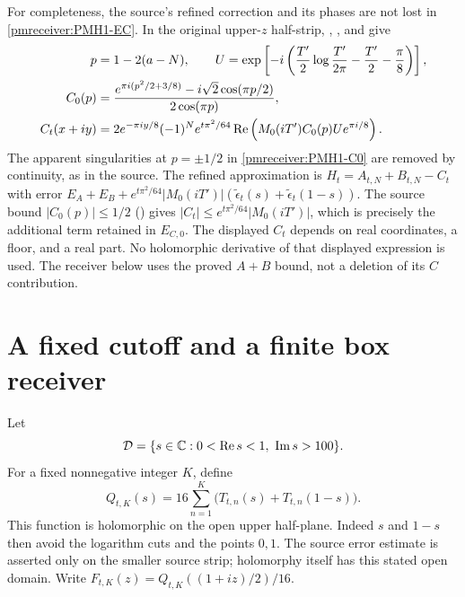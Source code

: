 \documentclass[11pt]{article}
\begin{document}
For completeness, the source's refined correction and its phases are
not lost in \eqref{pmreceiver:PMH1-EC}. In the original upper-$z$ half-strip,
, , and  give
\begin{align}
 p&=1-2(a-N),\qquad
 U=\exp\left[-i\left(\frac{T'}2\log\frac{T'}{2\pi}
                         -\frac{T'}2-\frac\pi8\right)\right],
 \label{pmreceiver:PMH1-phase}\\
 C_0(p)&=\frac{e^{\pi i(p^2/2+3/8)}-i\sqrt2\cos(\pi p/2)}
                 {2\cos(\pi p)},
 \label{pmreceiver:PMH1-C0}\\
 C_t(x+iy)&=2e^{-\pi iy/8}(-1)^N e^{t\pi^2/64}
       \operatorname{Re}\left(M_0(iT')C_0(p)Ue^{\pi i/8}\right).
 \label{pmreceiver:PMH1-C}
\end{align}
The apparent singularities at $p=\pm1/2$ in \eqref{pmreceiver:PMH1-C0} are
removed by continuity, as in the source. The refined approximation
is $H_t=A_{t,N}+B_{t,N}-C_t$ with error
$E_A+E_B+e^{t\pi^2/64}|M_0(iT')|
(\widetilde\epsilon_t(s)+\widetilde\epsilon_t(1-s))$.
The source bound $|C_0(p)|\le1/2$ () gives
$|C_t|\le e^{t\pi^2/64}|M_0(iT')|$, which is precisely the
additional term retained in $E_{C,0}$.
The displayed $C_t$ depends on real coordinates, a floor, and a real
part. No holomorphic derivative of that displayed expression is used.
The receiver below uses the proved $A+B$ bound, not a deletion of its
$C$ contribution.

\section{A fixed cutoff and a finite box receiver}

Let
\[
 \mathcal D=\{s\in\mathbb C:0<\operatorname{Re} s<1,\ \operatorname{Im} s>100\}.
\]
For a fixed nonnegative integer $K$, define
\begin{equation}\label{pmreceiver:PMH2-Q}
 Q_{t,K}(s)=16\sum_{n=1}^K
       \bigl(T_{t,n}(s)+T_{t,n}(1-s)\bigr).
\end{equation}
This function is holomorphic on the open upper half-plane. Indeed
$s$ and $1-s$ then avoid the logarithm cuts and the points $0,1$.
The source error estimate is asserted only on the smaller source
strip; holomorphy itself has this stated open domain.
Write $F_{t,K}(z)=Q_{t,K}((1+iz)/2)/16$.
\end{document}
